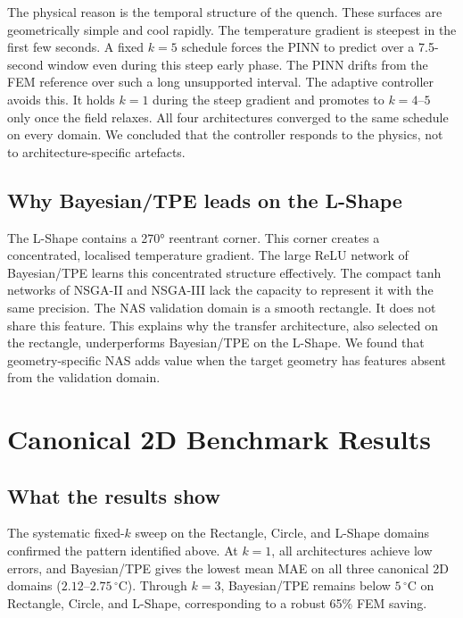 The physical reason is the temporal structure of the quench.
These surfaces are geometrically simple and cool rapidly.
The temperature gradient is steepest in the first few seconds.
A fixed $k=5$ schedule forces the PINN to predict over a 7.5-second window
even during this steep early phase.
The PINN drifts from the FEM reference over such a long unsupported interval.
The adaptive controller avoids this.
It holds $k=1$ during the steep gradient and promotes to $k=4$--$5$ only once
the field relaxes.
All four architectures converged to the same schedule on every domain.
We concluded that the controller responds to the physics, not to architecture-specific artefacts.

\subsection{Why Bayesian/TPE leads on the L-Shape}

The L-Shape contains a 270° reentrant corner.
This corner creates a concentrated, localised temperature gradient.
The large ReLU network of Bayesian/TPE learns this concentrated structure
effectively.
The compact tanh networks of NSGA-II and NSGA-III lack the capacity to
represent it with the same precision.
The NAS validation domain is a smooth rectangle.
It does not share this feature.
This explains why the transfer architecture, also selected on the rectangle,
underperforms Bayesian/TPE on the L-Shape.
We found that geometry-specific NAS adds value when the target geometry
has features absent from the validation domain.

\section{Canonical 2D Benchmark Results}
\label{sec:disc_2d}

\subsection{What the results show}

The systematic fixed-$k$ sweep on the Rectangle, Circle, and L-Shape domains
confirmed the pattern identified above.
At $k=1$, all architectures achieve low errors, and Bayesian/TPE gives the
lowest mean MAE on all three canonical 2D domains ($2.12$--$2.75\,^\circ\mathrm{C}$).
Through $k=3$, Bayesian/TPE remains below $5\,^\circ\mathrm{C}$ on Rectangle,
Circle, and L-Shape, corresponding to a robust 65\% FEM saving.

